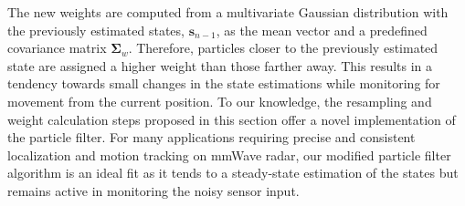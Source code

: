 \documentclass[10pt,journal,final]{IEEEtran}
\begin{document}
The new weights are computed from a multivariate Gaussian distribution with the previously estimated states, $\mathbf{s}_{n-1}$, as the mean vector and a predefined covariance matrix $\mathbf{\Sigma}_w$.
Therefore, particles closer to the previously estimated state are assigned a higher weight than those farther away. 
This results in a tendency towards small changes in the state estimations while monitoring for movement from the current position. 
To our knowledge, the resampling and weight calculation steps proposed in this section offer a novel implementation of the particle filter. 
For many applications requiring precise and consistent localization and motion tracking on mmWave radar, our modified particle filter algorithm is an ideal fit as it tends to a steady-state estimation of the states but remains active in monitoring the noisy sensor input.

\end{document}
